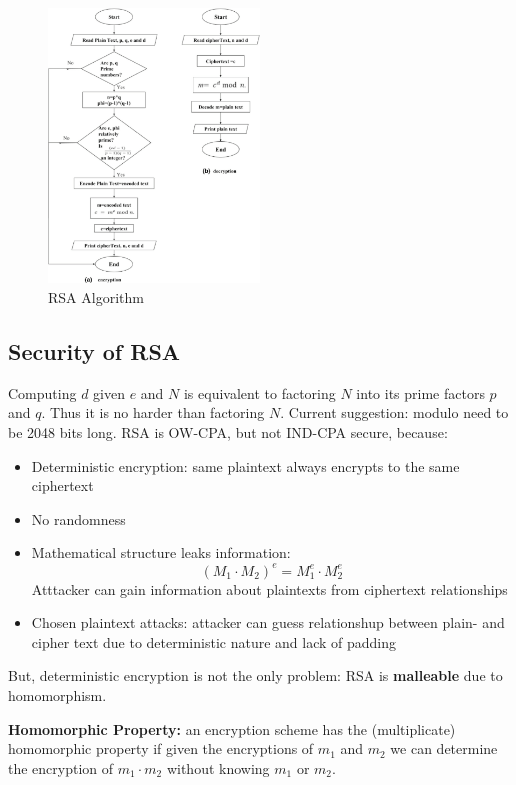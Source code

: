 \begin{figure}[h!]
    \centering
    \includegraphics[width=0.5\textwidth]{img/Block-diagram-of-RSA-algorithm.png}
    \caption{RSA Algorithm}
\end{figure}

\subsection{Security of RSA}
Computing $d$ given $e$ and $N$ is equivalent to factoring $N$ into its prime factors $p$ and $q$. Thus it is no harder than factoring $N$. 
Current suggestion: modulo need to be 2048 bits long. RSA is OW-CPA, but not IND-CPA secure, because:
\begin{itemize}
    \item Deterministic encryption: same plaintext always encrypts to the same ciphertext
    \item No randomness
    \item Mathematical structure leaks information: 
        \[ (M_1 \cdot M_2)^e = M_1^e \cdot M_2^e \]
        Atttacker can gain information about plaintexts from ciphertext relationships
    \item Chosen plaintext attacks: attacker can guess relationshup between plain- and cipher text due to deterministic nature and lack of padding
\end{itemize}

But, deterministic encryption is not the only problem: RSA is \textbf{malleable} due to homomorphism.

\begin{defn}
\textbf{Homomorphic Property:} an encryption scheme has the (multiplicate) homomorphic property if given the encryptions of $m_1$ and $m_2$
we can determine the encryption of $m_1 \cdot m_2$ without knowing $m_1$ or $m_2$.
\end{defn}

